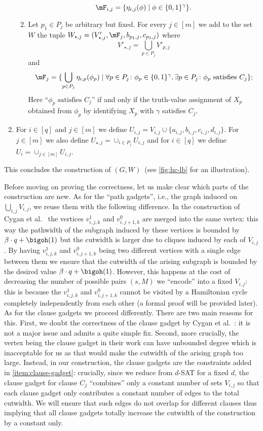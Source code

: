 \documentclass[a4paper,UKenglish,cleveref, autoref, thm-restate]{lipics-v2021}
\begin{document}
\begin{enumerate}
\begin{enumerate}
 \[
 	\mF_{i,j} = \{\eta_{i,j}(\phi) \mid \phi \in \{0,1\}^\gamma\}.
 \]
\item\label{item:clause-gadget} Let $p_1 \in P_j$ be arbitrary but fixed.
For every $j \in [m]$ we add to the set $W$ the tuple $W_{\star, j} = (V'_{\star,j}, \mF_j, b_{p_1, j}, c_{p_1, j})$ where
\[
	V'_{\star,j} = \bigcup_{p \in P_j} V'_{p, j}
\] 
and
\[
	\mF_j = \{\bigcup_{p \in P_j} \eta_{i,p}(\phi_p) \mid \forall p \in P_j \colon \phi_p \in \{0,1\}^\gamma, \exists p \in P_j \colon \phi_p \text{ satisfies } C_j\};
\]
Here ``$\phi_p \text{ satisfies } C_j$'' if and only if the truth-value assignment of $X_p$ obtained from $\phi_p$ by identifying $X_p$ with $\gamma$ satisfies $C_j$.
\end{enumerate}
\item For $i \in [q]$ and $j \in [m]$ we define $U_{i,j} = V_{i,j} \cup \{a_{i,j}, b_{i,j}, c_{i,j}, d_{i,j}\}$.
For $j \in [m]$ we also define $U_{\star, j} = \cup_{i \in P_j} U_{i,j}$ and for $i \in [q]$ we define $U_i = \cup_{j \in [m]} U_{i,j}$.
\end{enumerate}
This concludes the construction of $(G, W)$~(see \cref{fig:hc-lb} for an illustration). 



Before moving on proving the correctness, let us make clear which parts of the construction are new. 
As for the ``path gadgets'', i.e., the graph induced on 
$\bigcup_{i,j} V_{i,j}$, we reuse them with the following difference.
In the construction of Cygan et al.~\cite{DBLP:journals/jacm/CyganKN18} the vertices $v_{i,j,k}^1$ and $v_{i,j+1,k}^0$ are merged into the same vertex: this way the pathwidth of the subgraph induced by these vertices is bounded by $\beta \cdot q + \bigoh(1)$ but the cutwidth is larger due to cliques induced by each of $V_{i,j}$.  
By having $v_{i,j,k}^1$ and $v_{i,j+1,k}^0$ being two different vertices with a single edge between them we ensure that the cutwidth of the arising subgraph is bounded by the desired value $\beta \cdot q + \bigoh(1)$.
However, this happens at the cost of decreasing the number of possible pairs $(s, M)$ we ``encode'' into a fixed $V_{i,j}$: this is because the $v_{i,j,k}^1$ and $v_{i,j+1,k}^0$ cannot be visited by a Hamiltonian cycle completely independently from each other (a formal proof will be provided later).
As for the clause gadgets we proceed differently.
There are two main reasons for this.
First, we doubt the correctness of the clause gadget by Cygan et al.~\cite{DBLP:journals/jacm/CyganKN18}: it is not a major issue and admits a quite simple fix.
Second, more crucially, the vertex being the clause gadget in their work can have unbounded degree which is inacceptable for us as that would make the cutwidth of the arising graph too large.
Instead, in our construction, the clause gadgets are the constraints added in \cref{item:clause-gadget}: crucially, since we reduce from $d$-SAT for a fixed $d$, the clause gadget for clause $C_j$ ``combines'' only a constant number of sets $V_{i,j}$ so that each clause gadget only contributes a constant number of edges to the total cutwidth. 
We will ensure that such edges do not overlap for different clauses thus implying that all clause gadgets totally increase the cutwidth of the construction by a constant only.
\end{document}
